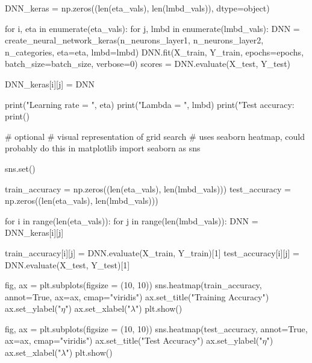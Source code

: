 \documentclass[%
oneside,                 %
final,                   %
10pt]{article}
\begin{document}
\bpycod
DNN_keras = np.zeros((len(eta_vals), len(lmbd_vals)), dtype=object)
        
for i, eta in enumerate(eta_vals):
    for j, lmbd in enumerate(lmbd_vals):
        DNN = create_neural_network_keras(n_neurons_layer1, n_neurons_layer2, n_categories,
                                         eta=eta, lmbd=lmbd)
        DNN.fit(X_train, Y_train, epochs=epochs, batch_size=batch_size, verbose=0)
        scores = DNN.evaluate(X_test, Y_test)
        
        DNN_keras[i][j] = DNN
        
        print("Learning rate = ", eta)
        print("Lambda = ", lmbd)
        print("Test accuracy: %
        print()

\epycod


































\bpycod
# optional
# visual representation of grid search
# uses seaborn heatmap, could probably do this in matplotlib
import seaborn as sns

sns.set()

train_accuracy = np.zeros((len(eta_vals), len(lmbd_vals)))
test_accuracy = np.zeros((len(eta_vals), len(lmbd_vals)))

for i in range(len(eta_vals)):
    for j in range(len(lmbd_vals)):
        DNN = DNN_keras[i][j]

        train_accuracy[i][j] = DNN.evaluate(X_train, Y_train)[1]
        test_accuracy[i][j] = DNN.evaluate(X_test, Y_test)[1]

        
fig, ax = plt.subplots(figsize = (10, 10))
sns.heatmap(train_accuracy, annot=True, ax=ax, cmap="viridis")
ax.set_title("Training Accuracy")
ax.set_ylabel("$\eta$")
ax.set_xlabel("$\lambda$")
plt.show()

fig, ax = plt.subplots(figsize = (10, 10))
sns.heatmap(test_accuracy, annot=True, ax=ax, cmap="viridis")
ax.set_title("Test Accuracy")
ax.set_ylabel("$\eta$")
ax.set_xlabel("$\lambda$")
plt.show()
\end{document}
